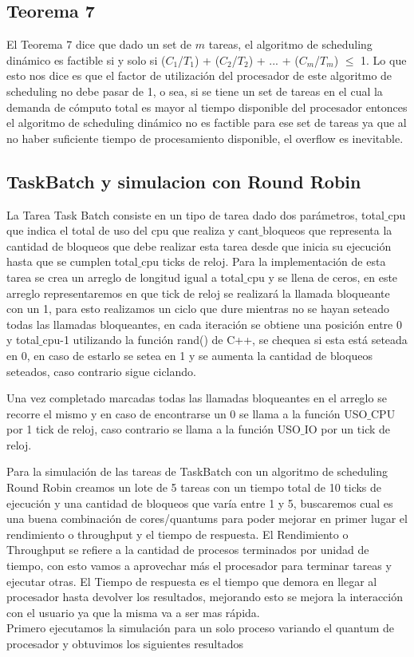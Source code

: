 \subsection{Teorema 7}
El Teorema 7 dice que dado un set de $m$ tareas, el algoritmo de scheduling dinámico es factible si y solo si ($C_1$/$T_1$) + ($C_2$/$T_2$) + ... + ($C_m$/$T_m$) $\le$ 1. Lo que esto nos dice es que el factor de utilización del procesador de este algoritmo de scheduling no debe pasar de 1, o sea, si se tiene un set de tareas en el cual la demanda de cómputo total es mayor al tiempo disponible del procesador entonces el algoritmo de scheduling dinámico no es factible para ese set de tareas ya que al no haber suficiente tiempo de procesamiento disponible, el overflow es inevitable.


\subsection{TaskBatch y simulacion con Round Robin}
La Tarea Task Batch consiste en un tipo de tarea dado dos parámetros, total$\_$cpu que indica el total de uso del cpu que realiza y cant$\_$bloqueos que representa la cantidad de bloqueos que debe realizar esta tarea desde que inicia su ejecución hasta que se cumplen total$\_$cpu ticks de reloj. Para la implementación de esta tarea se crea un arreglo de longitud igual a total$\_$cpu y se llena de ceros, en este arreglo representaremos en que tick de reloj se realizará la llamada bloqueante con un 1, para esto realizamos un ciclo que dure mientras no se hayan seteado todas las llamadas bloqueantes, en cada iteración se obtiene una posición entre 0 y total$\_$cpu-1 utilizando la función rand() de C++, se chequea si esta está seteada en 0, en caso de estarlo se setea en 1 y se aumenta la cantidad de bloqueos seteados, caso contrario sigue ciclando.

Una vez completado marcadas todas las llamadas bloqueantes en el arreglo se recorre el mismo y en caso de encontrarse un 0 se llama a la función USO$\_$CPU por 1 tick de reloj, caso contrario se llama a la función USO$\_$IO por un tick de reloj.

Para la simulación de las tareas de TaskBatch con un algoritmo de scheduling Round Robin creamos un lote de 5 tareas con un tiempo total de 10 ticks de ejecución y una cantidad de bloqueos que varía entre 1 y 5, buscaremos cual es una buena combinación de cores/quantums para poder mejorar en primer lugar el rendimiento o throughput y el tiempo de respuesta.
El Rendimiento o Throughput se refiere a la cantidad de procesos terminados por unidad de tiempo, con esto vamos a aprovechar más el procesador para terminar tareas y ejecutar otras.
El Tiempo de respuesta es el tiempo que demora en llegar al procesador hasta devolver los resultados, mejorando esto se mejora la interacción con el usuario ya que la misma va a ser mas rápida.\\
Primero ejecutamos la simulación para un solo proceso variando el quantum de procesador y obtuvimos los siguientes resultados


